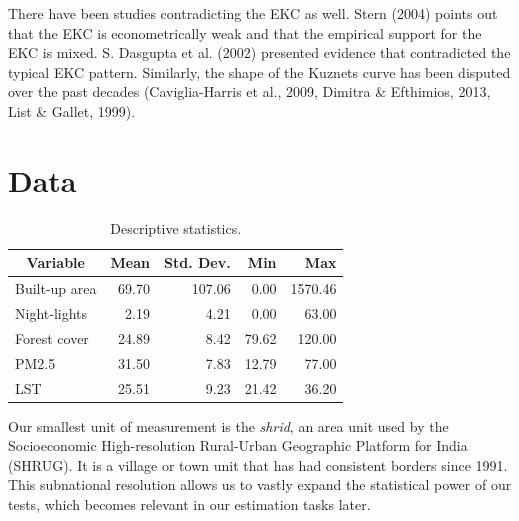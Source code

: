 \documentclass{article}
\begin{document}
There have been studies contradicting the EKC as well. Stern (2004) points out that the EKC is econometrically weak and that the empirical support for the EKC is mixed. S. Dasgupta et al. (2002) presented evidence that contradicted the typical EKC pattern. Similarly, the shape of the Kuznets curve has been disputed over the past decades (Caviglia-Harris et al., 2009, Dimitra \& Efthimios, 2013, List \& Gallet, 1999). 


\section{Data}

\begin{table}[h]
    \centering
    \begin{tabular}{|l|r|r|r|r|}
    \hline
    \multicolumn{1}{|c|}{\textbf{Variable}} & \multicolumn{1}{c|}{\textbf{Mean}} & \multicolumn{1}{c|}{\textbf{Std. Dev.}} & \textbf{Min} & \textbf{Max} \\ \hline
    Built-up area                           & 69.70                             & 107.06                                  & 0.00            & 1570.46      \\ \hline
    Night-lights                            & 2.19                              & 4.21                                   & 0.00            & 63.00           \\ \hline
    Forest cover                            & 24.89                              & 8.42                                    & 79.62        & 120.00          \\ \hline
    PM2.5                                   & 31.50                              & 7.83                                    & 12.79        & 77.00           \\ \hline
    LST                                     & 25.51                             & 9.23                                   & 21.42       & 36.20       \\ \hline
    \end{tabular}
    \caption{Descriptive statistics.}
\end{table}


Our smallest unit of measurement is the \textit{shrid}, an area unit used by the Socioeconomic High-resolution Rural-Urban Geographic Platform for India (SHRUG). It is a village or town unit that has had consistent borders since 1991. This subnational resolution allows us to vastly expand the  statistical power of our tests, which becomes relevant in our estimation tasks later.
\end{document}
